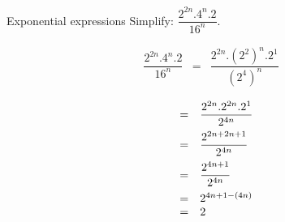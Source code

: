 \begin{wex}
{
Exponential expressions
}
{
Simplify: $\dfrac{2^{2n} .4^n . 2 }{ 16^n}. $
}
{

\begin{eqnarray*}
\dfrac{2^{2n} . 4^n . 2 }{ 16^n} & = &\dfrac{2^{2n} . (2^2)^n . 2^1 }{ (2^4)^n} 
\end{eqnarray*}


\begin{equation*}
 \begin{array}{rcl}
   &= & \dfrac{ 2^{2n} . 2^{2n} . 2^1 }{ 2^{4n} } \vspace{5pt}\\
& = & \dfrac{ 2^{2n + 2n +1}}{2^{4n}} \vspace{5pt}\\
& = & \dfrac{2^{4n+1}}{2^{4n}} \vspace{5pt}\\
& = & 2^{4n+1-(4n)} \\
& = & 2
 \end{array}

\end{equation*}


 
}
\end{wex}


